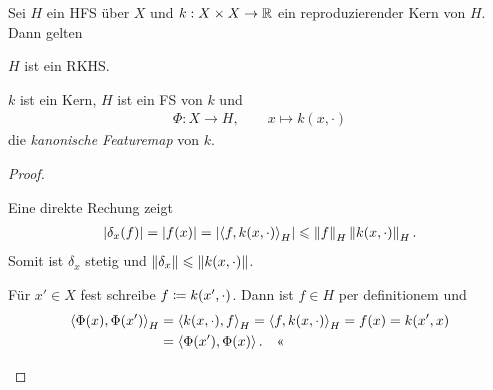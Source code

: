 \begin{lem}
\label{prop:5.2.2}
Sei $H$ ein HFS über $X$ und $k: X\times X\to \mathbb{R}$ ein reproduzierender Kern von
$H$. Dann gelten
\begin{propenum}
\item $H$ ist ein RKHS.
\item $k$ ist ein Kern, $H$ ist ein FS von $k$ und
\begin{align*}
\Phi: X\to H,\qquad x\mapsto k(x,\cdot)
\end{align*}
die \emph{kanonische Featuremap} von $k$.\fishhere
\end{propenum}
\end{lem}
\begin{proof}
\begin{proofenum}
\item Eine direkte Rechung zeigt
\begin{align*}
\left|\delta_x(f)\right| = \left|f(x)\right| = \left|\left\langle f,k(x,\cdot)\right\rangle_H\right| \leqslant
\left\|f\right\|_H\left\|k(x,\cdot)\right\|_H.
\end{align*}
Somit ist $\delta_x$ stetig und $\left\|\delta_x\right\| \leqslant \left\|k(x,\cdot)\right\|$.
\item Für $x'\in X$ fest schreibe $f\coloneq k(x',\cdot)$. Dann ist $f\in H$ per
definitionem und
\begin{align*}
\left\langle\Phi(x),\Phi(x')\right\rangle_H &= \left\langle k(x,\cdot),f\right\rangle_H = \left\langle f,k(x,\cdot)\right\rangle_H = f(x) =
k(x',x)\\ &= \left\langle\Phi(x'),\Phi(x)\right\rangle.\quad\text{<<}
\end{align*}
\end{proofenum}
\end{proof}

